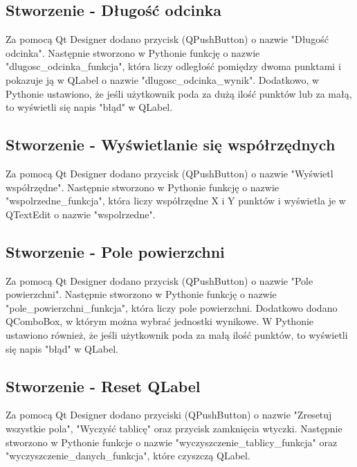 \subsection{Stworzenie - Długość odcinka}
Za pomocą Qt Designer dodano przycisk (QPushButton) o nazwie "Długość odcinka". Następnie stworzono w Pythonie funkcję o nazwie "dlugosc\_odcinka\_funkcja", która liczy odległość pomiędzy dwoma punktami i pokazuje ją w QLabel o nazwie "dlugosc\_odcinka\_wynik". Dodatkowo, w Pythonie ustawiono, że jeśli użytkownik poda za dużą ilość punktów lub za małą, to wyświetli się napis "błąd" w QLabel.

\subsection{Stworzenie - Wyświetlanie się współrzędnych}
Za pomocą Qt Designer dodano przycisk (QPushButton) o nazwie "Wyświetl współrzędne". Następnie stworzono w Pythonie funkcję o nazwie "wspolrzedne\_funkcja", która liczy współrzędne X i Y punktów i wyświetla je w QTextEdit o nazwie "wspolrzedne".

\subsection{Stworzenie - Pole powierzchni}
Za pomocą Qt Designer dodano przycisk (QPushButton) o nazwie "Pole powierzchni". Następnie stworzono w Pythonie funkcję o nazwie "pole\_powierzchni\_funkcja", która liczy pole powierzchni. Dodatkowo dodano QComboBox, w którym można wybrać jednostki wynikowe. W Pythonie ustawiono również, że jeśli użytkownik poda za małą ilość punktów, to wyświetli się napis "błąd" w QLabel.

\subsection{Stworzenie - Reset QLabel}
Za pomocą Qt Designer dodano przyciski (QPushButton) o nazwie "Zresetuj wszystkie pola", "Wyczyść tablicę" oraz przycisk zamknięcia wtyczki. Następnie stworzono w Pythonie funkcje o nazwie "wyczyszczenie\_tablicy\_funkcja" oraz "wyczyszczenie\_danych\_funkcja", które czyszczą QLabel.